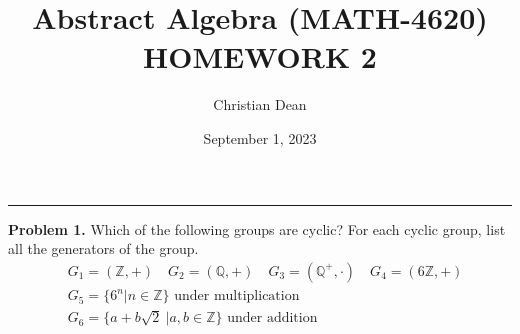 \documentclass[12pt, letterpaper]{article}
\title{Abstract Algebra (MATH-4620) HOMEWORK 2}
\author{Christian Dean}
\date{September 1, 2023}
\newenvironment{problem}
    [1]
    {\noindent \textbf{Problem #1.}}
    {\vspace{3mm}}
\begin{document}
\maketitle

\noindent\hfil\rule{16cm}{0.4pt}\hfil

\begin{problem}{1}
    Which of the following groups are cyclic? For each cyclic group, list all the generators of the group.
    \begin{align*}
        &G_1 = (\mathbb{Z}, +) \quad G_2 = (\mathbb{Q}, +) \quad G_3 = (\mathbb{Q}^+, \cdot) \quad G_4 = (6\mathbb{Z}, +)\\
        &G_5 = \{6^n | n \in \mathbb{Z}\} \text{ under multiplication}\\
        &G_6 = \{a+b\sqrt{2}\ | a, b \in \mathbb{Z}\} \text{ under addition}
    \end{align*}
\end{problem}
\end{document}
